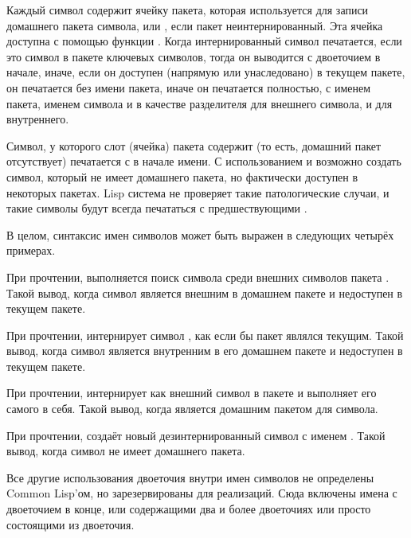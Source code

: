 Каждый символ содержит ячейку пакета, которая используется для записи домашнего
пакета символа, или {\false}, если пакет неинтернированный. Эта ячейка доступна
с помощью функции .
Когда интернированный символ печатается, если это символ в пакете ключевых
символов, тогда он выводится с двоеточием в начале, иначе, если он доступен
(напрямую или унаследовано) в текущем пакете, он печатается без имени пакета,
иначе он печатается полностью, с именем пакета, именем символа и \cd{:} в
качестве разделителя для внешнего символа, и \cd{::} для внутреннего.

Символ, у которого слот (ячейка) пакета содержит {\false} (то есть, домашний
пакет отсутствует) печатается с \cd{\#:} в начале имени. С использованием
 и  возможно создать символ, который не имеет
домашнего пакета, но фактически доступен в некоторых пакетах.
Lisp система не проверяет такие патологические случаи, и такие символы будут
всегда печататься с предшествующими \cd{\#:}.

В целом, синтаксис имен символов может быть выражен в следующих четырёх примерах.

\begin{flushdesc}
\item[\cd{foo:bar}]
При прочтении, выполняется поиск символа  среди внешних символов пакета
. Такой вывод, когда символ  является внешним в домашнем пакете
 и недоступен в текущем пакете.

\item[\cd{foo::bar}]
При прочтении, интернирует символ , как если бы пакет  являлся
текущим. Такой вывод, когда символ  является внутренним в его домашнем
пакете  и недоступен в текущем пакете.

\item[\cd{:bar}]
При прочтении, интернирует  как внешний символ в пакете  и
выполняет его самого в себя. Такой вывод, когда  является домашним
пакетом для символа.

\item[\cd{\#:bar}]
При прочтении, создаёт новый дезинтернированный символ с именем .
Такой вывод, когда символ  не имеет домашнего пакета.
\end{flushdesc}

Все другие использования двоеточия внутри имен символов не определены Common
Lisp'ом, но зарезервированы для реализаций. Сюда включены имена с двоеточием в
конце, или содержащими два и более двоеточиях или просто состоящими из
двоеточия.


